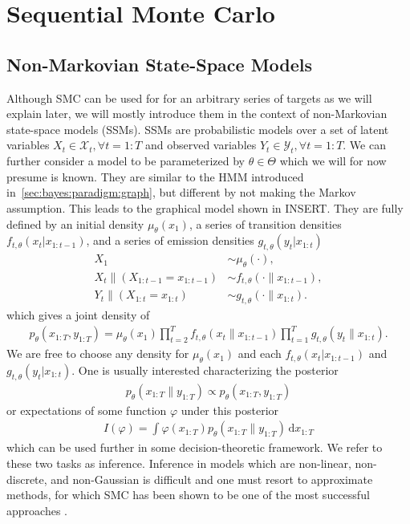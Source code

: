
\section{Sequential Monte Carlo}
\label{sec:part:smc:smc}

\subsection{Non-Markovian State-Space Models}

Although SMC can be used for for an arbitrary series of targets as we will explain
later, we will mostly introduce them in the context of non-Markovian state-space
models (SSMs).  SSMs are probabilistic models over a set of latent variables 
$X_t \in \mathcal{X}_t, \forall t = 1:T$
and observed variables $Y_t \in \mathcal{Y}_t, \forall t = 1:T$.  
We can further consider a model to be parameterized by $\theta \in \Theta$ which
we will for now presume is known.
They are similar to
the HMM introduced in~\ref{sec:bayes:paradigm:graph}, but different by not
making the Markov assumption.  This leads to the graphical model shown in INSERT.
They are fully defined by an initial density $\mu_{\theta} (x_1)$,
a series of transition densities $f_{t,\theta} (x_t | x_{1:t-1})$, and a series of
emission densities $g_{t,\theta} (y_t | x_{1:t})$
\begin{align*}
X_1 &\sim \mu_{\theta}(\cdot), \\
X_t \| (X_{1:t - 1} = x_{1:t - 1}) &\sim f_{t,\theta}(\cdot \| x_{1:t - 1}), \\
Y_t \| (X_{1:t} = x_{1:t}) &\sim g_{t,\theta}(\cdot \| x_{1:t}).
\end{align*}
which gives a joint density of
\begin{align*}
p_{\theta}(x_{1:T}, y_{1:T}) = \mu_{\theta}(x_1) \prod_{t = 2}^T f_{t,\theta}(x_t \| x_{1:t - 1}) \prod_{t = 1}^T g_{t,\theta}(y_t \| x_{1:t}).
\end{align*}
We are free to choose any density for
$\mu_{\theta} (x_1)$ and each $f_{t,\theta} (x_t | x_{1:t-1})$ and $g_{t,\theta} (y_t | x_{1:t})$. One is usually interested characterizing the posterior
\begin{align*}
p_{\theta}(x_{1:T} \| y_{1:T}) \propto p_{\theta}(x_{1:T}, y_{1:T})
\end{align*}
or expectations of some function $\varphi$ under this posterior
\begin{align*}
I(\varphi) = \int \varphi(x_{1:T}) p_{\theta}(x_{1:T} \| y_{1:T}) \,\mathrm dx_{1:T}
\end{align*}
which can be used further in some decision-theoretic framework.
We refer to these two tasks as inference.
Inference in models which are non-linear, non-discrete, and non-Gaussian is difficult
and one must resort to approximate methods, for which SMC has been shown to
be one of the most successful approaches \citep{doucet2009tutorial}.


